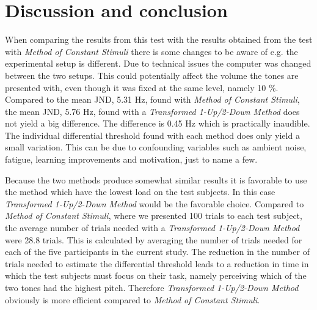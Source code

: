 \section*{Discussion and conclusion}
%
When comparing the results from this test with the results obtained from the test with \textit{Method of Constant Stimuli} there is some changes to be aware of e.g. the experimental setup is different. Due to technical issues the computer was changed between the two setups. This could potentially affect the volume the tones are presented with, even though it was fixed at the same level, namely 10 \%. \blankline
%
Compared to the mean JND, 5.31 Hz, found with \textit{Method of Constant Stimuli}, the mean JND, 5.76 Hz, found with a \textit{Transformed 1-Up/2-Down Method} does not yield a big difference. The difference is 0.45 Hz which is practically inaudible. The individual differential threshold found with each method does only yield a small variation. This can be due to confounding variables such as ambient noise, fatigue, learning improvements and motivation, just to name a few.  

Because the two methods produce somewhat similar results it is favorable to use the method which have the lowest load on the test subjects. In this case \textit{Transformed 1-Up/2-Down Method} would be the favorable choice. Compared to \textit{Method of Constant Stimuli}, where we presented 100 trials to each test subject, the average number of trials needed with a \textit{Transformed 1-Up/2-Down Method} were 28.8 trials. This is calculated by averaging the number of trials needed for each of the five participants in the current study. The reduction in the number of trials needed to estimate the differential threshold leads to a reduction in time in which the test subjects must focus on their task, namely perceiving which of the two tones had the highest pitch. Therefore \textit{Transformed 1-Up/2-Down Method} obviously is more efficient compared to \textit{Method of Constant Stimuli}.

